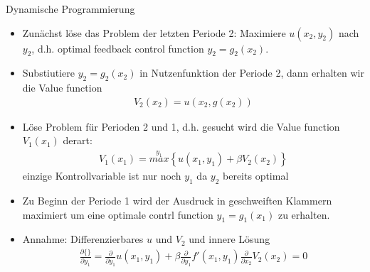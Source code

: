 \documentclass[smaller,compress]{beamer}  %
\begin{document}
\begin{frame}
  Dynamische Programmierung
  \begin{itemize}
    \item Zunächst löse das Problem der letzten Periode 2: Maximiere $u(x_2,y_2)$ nach $y_2$, d.h. optimal feedback control function
    $y_2=g_2(x_2)$.
    \item Substiutiere $y_2=g_2(x_2)$ in Nutzenfunktion der Periode 2, dann erhalten wir die Value function
    \begin{align}
      V_2(x_2) = u(x_2,g(x_2))
    \end{align}
    \item Löse Problem für Perioden 2 und 1, d.h. gesucht wird die Value function $V_1(x_1)$ derart:
    \begin{align}
      V_1(x_1) = \overset{y_1}{max}\left\{u(x_1,y_1)+\beta V_2(x_2)\right\}
    \end{align}
    einzige Kontrollvariable ist nur noch $y_1$ da $y_2$ bereits optimal
    \item Zu Beginn der Periode 1 wird der Ausdruck in geschweiften Klammern maximiert um eine optimale contrl function $y_1 = g_1(x_1)$ zu erhalten.
    \item Annahme: Differenzierbares $u$ und $V_2$ und innere Lösung
    \begin{align}
      \frac{\partial\{\}}{\partial y_1} = \frac{\partial}{\partial y_1} u(x_1,y_1) + \beta \frac{\partial}{\partial y_1} f'(x_1,y_1)\frac{\partial}{\partial x_2}V_2(x_2) = 0 \label{eq:B1}
    \end{align}
  \end{itemize}
\end{frame}
\end{document}
